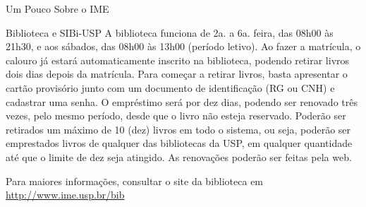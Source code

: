 \begin{secao}{Um Pouco Sobre o IME}
\begin{subsecao}{Biblioteca e SIBi-USP}
A biblioteca funciona de 2a. a 6a. feira, das 08h00 às 21h30, e aos sábados, das
08h00 às 13h00 (período letivo). Ao fazer a matrícula, o calouro já estará
automaticamente inscrito na biblioteca, podendo retirar livros dois dias depois
da matrícula. Para começar a retirar livros, basta apresentar o cartão
provisório junto com um documento de identificação (RG ou CNH) e cadastrar uma
senha. O empréstimo será por dez dias, podendo ser renovado três vezes, pelo
mesmo período, desde que o livro não esteja reservado. Poderão ser retirados um
máximo de 10 (dez) livros em todo o sistema, ou seja, poderão ser emprestados
livros de qualquer das bibliotecas da USP, em qualquer quantidade até que o
limite de dez seja atingido. As renovações poderão ser feitas pela web.

Para maiores informações, consultar o site da biblioteca em
\url{http://www.ime.usp.br/bib}

\end{subsecao}
\end{secao}
